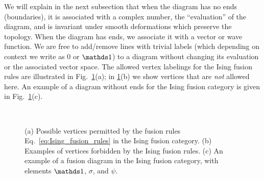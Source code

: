 We will explain in the next subsection that when the diagram has no ends (boundaries), it is associated with a complex number, the ``evaluation'' of the diagram, and is invariant under smooth deformations which preserve the topology. When the diagram has ends, we associate it with a vector or wave function.
We are free to add/remove lines with trivial labels (which depending on context we write as $0$ or $\I$) to a diagram without changing its evaluation or the associated vector space. The allowed vertex labelings for the Ising fusion rules are illustrated in Fig.~\ref{fig:Isingfusiondiagram}(a); in \ref{fig:Isingfusiondiagram}(b) we show vertices that are {\em not} allowed here.
An example of a diagram without ends for the Ising fusion category is given in Fig.~\ref{fig:Isingfusiondiagram}(c).

\begin{figure}
	\\
	\caption{
		(a) Possible vertices permitted by the fusion rules Eq.~\eqref{eq:Ising_fusion_rules} in the Ising fusion category.
		(b) Examples of vertices forbidden by the Ising fusion rules.
		(c) An example of a fusion diagram in the Ising fusion category, with elements $\I$, $\sigma$, and $\psi$.
	}
	\label{fig:Isingfusiondiagram}
\end{figure}




